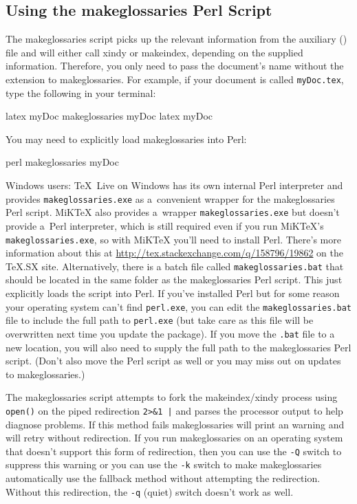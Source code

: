 \documentclass[report,inlinetitle]{nlctdoc}
\begin{document}
\subsection{Using the makeglossaries Perl Script}
\label{sec:makeglossariesapp}

The \gls{makeglossaries} script picks up the relevant information
from the auxiliary () file and will either call
\gls{xindy} or \gls{makeindex}, depending on the supplied
information. Therefore, you only need to pass the document's name
without the extension to \gls*{makeglossaries}. For example, if your
document is called \texttt{myDoc.tex}, type the following in your
terminal:
\begin{prompt}
latex myDoc
makeglossaries myDoc
latex myDoc
\end{prompt}
You may need to explicitly load \gls{makeglossaries} into Perl:
\begin{prompt}
perl makeglossaries myDoc
\end{prompt}

Windows users: TeX~Live on Windows has its own internal Perl
interpreter and provides \texttt{makeglossaries.exe} as a~convenient
wrapper for the \gls{makeglossaries} Perl script. MiKTeX also
provides a~wrapper \texttt{makeglossaries.exe} but doesn't provide
a~Perl interpreter, which is still required even if you run MiKTeX's
\texttt{makeglossaries.exe}, so with MiKTeX you'll need to install
Perl. There's more information about this at
\url{http://tex.stackexchange.com/q/158796/19862} on the TeX.SX
site. Alternatively, there is a batch file called
\texttt{makeglossaries.bat} that should be located in the same
folder as the \gls{makeglossaries} Perl script. This just explicitly
loads the script into Perl. If you've installed Perl but for some
reason your operating system can't find \texttt{perl.exe}, you can
edit the \texttt{makeglossaries.bat} file to include the full path
to \texttt{perl.exe} (but take care as this file will be overwritten
next time you update the  package). If you move
the \texttt{.bat} file to a new location, you will also need to
supply the full path to the \gls{makeglossaries} Perl script. (Don't
also move the Perl script as well or you may miss out on updates to
\gls{makeglossaries}.)

The \gls{makeglossaries} script attempts to fork the
\gls{makeindex}\slash\gls{xindy} process using \texttt{open()} on the
piped redirection \verb"2>&1 |" and parses the processor output to
help diagnose problems.  If this method fails \gls{makeglossaries}
will print an  warning and will retry without
redirection. If you run \gls{makeglossaries} on an operating system
that doesn't support this form of redirection, then you can use the
\texttt{-Q} switch to suppress this warning or you can use the
\texttt{-k} switch to make \gls{makeglossaries} automatically use
the fallback method without attempting the redirection. Without this
redirection, the \texttt{-q} (quiet) switch doesn't work as well.
\end{document}
